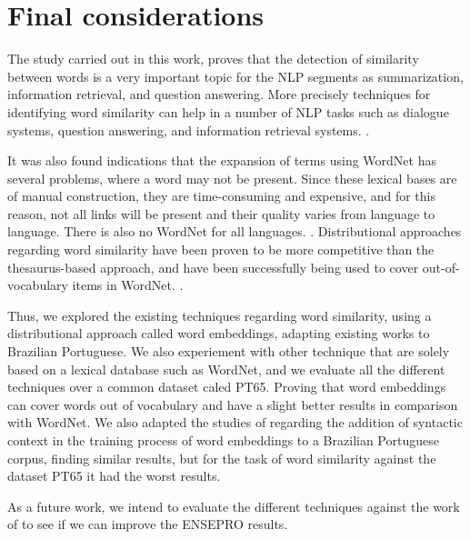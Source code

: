 \section{Final considerations}\label{chap:conclusions}

The study carried out in this work, proves that the detection of similarity between words is a very important topic for the NLP segments as summarization, information retrieval, and question answering. More precisely techniques for identifying word similarity can help in a number of NLP tasks such as dialogue systems, question answering, and information retrieval systems. \cite{Islam2007ApplicationsOC,Pilehvar2013,Agirre2009}.

It was also found indications that the expansion of terms using WordNet has several problems, where a word may not be present. Since these lexical bases are of manual construction, they are time-consuming and expensive, and for this reason, not all links will be present and their quality varies from language to language.  There is also no WordNet for all languages. \cite{Leeuwenberga2016}. Distributional approaches regarding word similarity have been proven to be more competitive than the thesaurus-based approach, and have been successfully being used to cover out-of-vocabulary items in WordNet.  \cite{Agirre2009}.


Thus, we explored the existing techniques regarding word similarity, using a distributional approach called word embeddings, adapting existing works to Brazilian Portuguese. We also experiement with other  technique  that  are  solely based on a lexical database such as WordNet, and we evaluate all the different techniques over a common dataset caled PT65. Proving that word embeddings can cover words out of vocabulary and have a slight better results in comparison with WordNet. We also adapted the studies of  regarding the addition of syntactic context in the training process of word embeddings to a Brazilian Portuguese corpus, finding similar results, but for the task of word similarity against the dataset PT65 it had the worst results.

As a future work, we intend to evaluate the different techniques against the work of  to see if we can improve the ENSEPRO results.
 
 